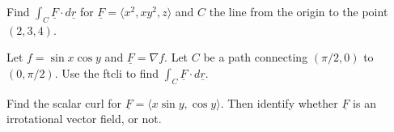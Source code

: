 \documentclass[12pt,letterpaper,noanswers]{exam}
\newcommand{\mb}[1]{\underline{#1}}
\begin{document}
 \pdfpageheight 11in 
  \pdfpagewidth 8.5in



\begin{questions}
\question Find $\displaystyle\int_C \mb F\cdot d\mb r$ for $\mb F = \langle x^2, xy^2, z\rangle$ and $C$ the line from the origin to the point $(2,3,4)$.

\vfill

\item 
Let $f = \sin x\cos y$ and $\mb F = \nabla f.$  Let $C$ be a path connecting $(\pi/2,0)$ to $(0,\pi/2)$.  Use the ftcli to find $\int_C \mb F \cdot d\mb r$.
\vfill

\item  Find the scalar curl for $\mb F = \langle x\sin y, \cos y \rangle$.  Then identify whether $\mb F$ is an irrotational vector field, or not.

\vfill

\end{questions}
\end{document}
